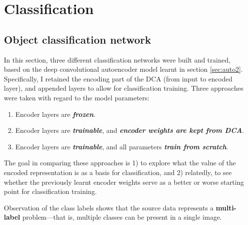 

\section{Classification}
\label{sec:class}




\subsection{Object classification network}

In this section, three different classification networks were built and trained, based on the deep convolutional autoencoder model learnt in section \textcolor{blue}{\ref{sec:auto2}}. Specifically, I retained the encoding part of the DCA (from input to encoded layer), and appended layers to allow for classification training. Three approaches were taken with regard to the model parameters:

\begin{enumerate}

	\item{Encoder layers are \textbf{\textsl{frozen}}.}
	\item{Encoder layers are \textbf{\textsl{trainable}}, and \textbf{\textsl{encoder weights are kept from DCA}}.}
	\item{Encoder layers are \textbf{\textsl{trainable}}, and all parameters \textbf{\textsl{train from scratch}}.}

\end{enumerate}

The goal in comparing these approaches is 1) to explore what the value of the encoded representation is as a basis for classification, and 2) relatedly, to see whether the previously learnt encoder weights serve as a better or worse starting point for classification training.

Observation of the class labels shows that the source data represents a \textbf{multi-label} problem---that is, multiple classes can be present in a single image.


